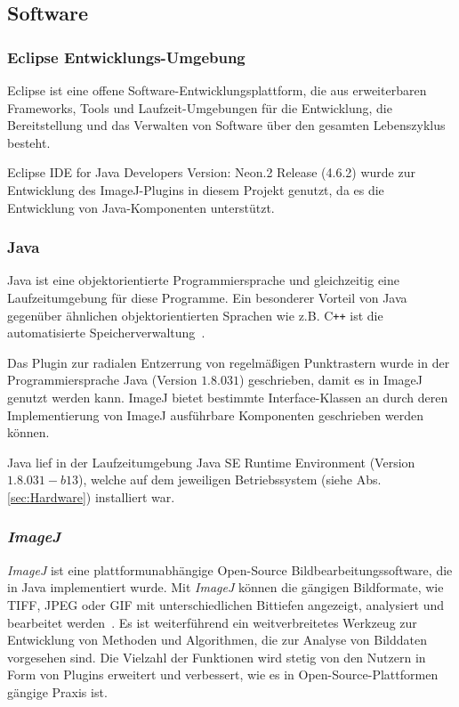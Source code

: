 \subsection{Software}\label{sec:Software}

\subsubsection{Eclipse Entwicklungs-Umgebung}
Eclipse ist eine offene Software-Entwicklungsplattform, die aus erweiterbaren Frameworks, Tools und Laufzeit-Umgebungen für die Entwicklung, die Bereitstellung und das Verwalten von Software über den gesamten Lebenszyklus besteht.
\cite{eclipse}

Eclipse IDE for Java Developers Version: Neon.2 Release (4.6.2) wurde zur Entwicklung des ImageJ-Plugins in diesem Projekt genutzt, da es die Entwicklung von Java-Komponenten unterstützt. 


\subsubsection{Java}
Java ist eine objektorientierte Programmiersprache und gleichzeitig eine Laufzeitumgebung für diese Programme. Ein besonderer Vorteil von Java gegenüber ähnlichen objektorientierten Sprachen wie z.B. C\texttt{++} ist die automatisierte Speicherverwaltung~\cite{java}. 

Das Plugin zur radialen Entzerrung von regelmäßigen Punktrastern wurde in der Programmiersprache Java (Version $ 1.8.0 31 $) geschrieben, damit es in ImageJ genutzt werden kann. ImageJ bietet bestimmte Interface-Klassen an durch deren Implementierung von ImageJ ausführbare Komponenten geschrieben werden können.

Java lief in der Laufzeitumgebung Java SE Runtime Environment (Version $ 1.8.0 31-b13 $), welche auf dem jeweiligen Betriebssystem (siehe Abs. \ref{sec:Hardware}) installiert war.

\subsubsection{\textit{ImageJ}}

\textit{ImageJ} ist eine plattformunabhängige Open-Source Bildbearbeitungssoftware, die in Java implementiert wurde. Mit \textit{ImageJ} können die gängigen Bildformate, wie TIFF, JPEG oder GIF mit unterschiedlichen Bittiefen angezeigt, analysiert und bearbeitet werden~\cite{Collins_ImageJ}. Es ist weiterführend ein weitverbreitetes Werkzeug zur Entwicklung von Methoden und Algorithmen, die zur Analyse von Bilddaten vorgesehen sind. Die Vielzahl der Funktionen wird stetig von den Nutzern in Form von Plugins erweitert und verbessert, wie es in Open-Source-Plattformen gängige Praxis ist.

